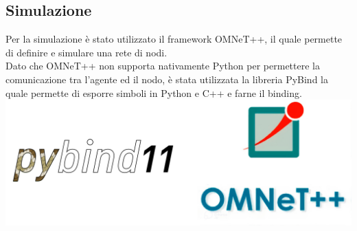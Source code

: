 \documentclass[compress]{beamer}
\begin{document}
\subsection{Simulazione}
\begin{frame}{\subsecname}
    Per la simulazione è stato utilizzato il framework OMNeT++, il quale permette di definire e simulare una rete di nodi. \\Dato che OMNeT++ non supporta nativamente Python per permettere la comunicazione tra l'agente ed il nodo, è stata utilizzata la libreria PyBind la quale permette di esporre simboli in Python e C++ e farne il binding.
    \begin{adjustbox}{margin=0cm 0cm 0cm 0.5cm, center} %
        \includegraphics[width=.8\textwidth]{figs/pybind_omnet.png}
    \end{adjustbox}
\end{frame}
\end{document}
